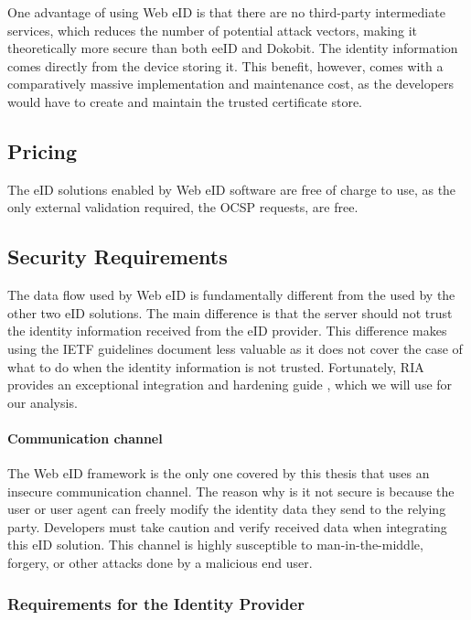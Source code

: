 One advantage of using Web eID is that there are no third-party intermediate services, which reduces the number of potential attack vectors, making it theoretically more secure than both eeID and Dokobit. The identity information comes directly from the device storing it. This benefit, however, comes with a comparatively massive implementation and maintenance cost, as the developers would have to create and maintain the trusted certificate store.

\subsection{Pricing}

The eID solutions enabled by Web eID software are free of charge to use, as the only external validation required, the OCSP \cite{rfc6960} requests, are free.

\subsection{Security Requirements}

The data flow used by Web eID is fundamentally different from the used by the other two eID solutions. The main difference is that the server should not trust the identity information received from the eID provider. This difference makes using the IETF guidelines document \cite{ietf-oauth-security-topics-19} less valuable as it does not cover the case of what to do when the identity information is not trusted. Fortunately, RIA provides an exceptional integration and hardening guide \cite{ria-webeid-systemarchitecture}, which we will use for our analysis.

\paragraph{Communication channel}

The Web eID framework is the only one covered by this thesis that uses an insecure communication channel. The reason why is it not secure is because the user or user agent can freely modify the identity data they send to the relying party. Developers must take caution and verify received data when integrating this eID solution. This channel is highly susceptible to man-in-the-middle, forgery, or other attacks done by a malicious end user.

\subsubsection{Requirements for the Identity Provider}

